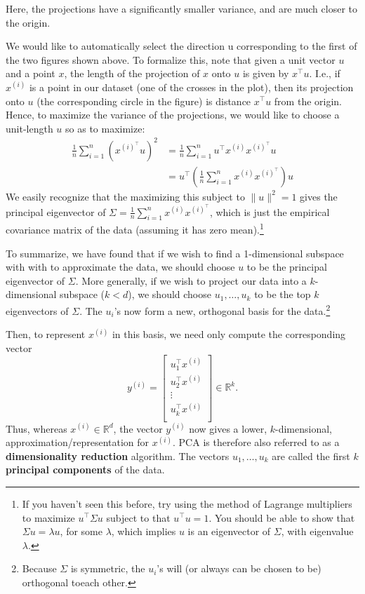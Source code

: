 
Here, the projections have a significantly smaller variance, and are much
closer to the origin.

We would like to automatically select the direction u corresponding to
the first of the two figures shown above. To formalize this, note that given a
unit vector $u$ and a point $x$, the length of the projection of $x$ onto $u$ is given
by $x^\top u$. I.e., if $x^{(i)}$
is a point in our dataset (one of the crosses in the plot),
then its projection onto $u$ (the corresponding circle in the figure) is distance
$x^\top u$ from the origin. Hence, to maximize the variance of the projections, we
would like to choose a unit-length $u$ so as to maximize:
\begin{align*}
    \frac{1}{n} \sum_{i=1}^n (x^{(i)^\top} u)^2 &= \frac{1}{n} \sum_{i=1}^n u^\top x^{(i)} x^{(i)^\top} u\\
        &= u^\top \left( \frac{1}{n} \sum_{i=1}^n x^{(i)} x^{(i)^\top} \right) u
\end{align*}
We easily recognize that the maximizing this subject to $\lVert u \rVert^2 = 1$ gives the
principal eigenvector of $\Sigma = \frac{1}{n}\sum^n_{i=1} x^{(i)}x^{(i)^\top}$, which is just the empirical
covariance matrix of the data (assuming it has zero mean).\footnote{
If you haven't seen this before, try using the method of Lagrange multipliers to maximize $u^\top \Sigma u$ subject to that $u^\top u = 1$.
You should be able to show that $\Sigma u = \lambda u$, for some
$\lambda$, which implies $u$ is an eigenvector of $\Sigma$, with eigenvalue $\lambda$.}

To summarize, we have found that if we wish to find a 1-dimensional
subspace with with to approximate the data, we should choose $u$ to be the
principal eigenvector of $\Sigma$. More generally, if we wish to project our data
into a $k$-dimensional subspace ($k < d$), we should choose $u_1, \ldots, u_k$ to be the
top $k$ eigenvectors of $\Sigma$. The $u_i$'s now form a new, orthogonal basis for the
data.\footnote{Because $\Sigma$ is symmetric, the $u_i$'s will (or always can be chosen to be) orthogonal toeach other.}

Then, to represent $x^{(i)}$ in this basis, we need only compute the corresponding vector
\[
y^{(i)} = \begin{bmatrix}
    u_1^\top x^{(i)}\\
    u_2^\top x^{(i)}\\
    \vdots\\
    u_k^\top x^{(i)}\\
\end{bmatrix} \in \mathbb R^k.
\]
Thus, whereas $x^{(i)} \in \mathbb R^d$, the vector $y^{(i)}$ now gives a lower, $k$-dimensional,
approximation/representation for $x^{(i)}$. PCA is therefore also referred to as
a \textbf{dimensionality reduction} algorithm. The vectors $u_1, \ldots, u_k$ are called
the first $k$ \textbf{principal components} of the data.

